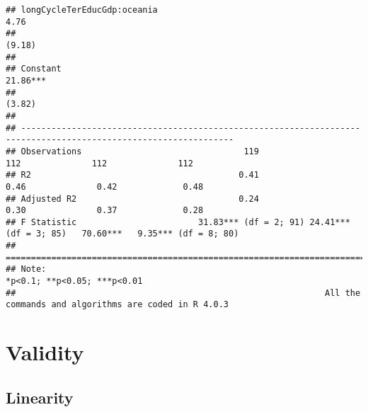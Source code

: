 \documentclass[
]{article}
\newenvironment{Shaded}{\begin{snugshade}}{\end{snugshade}}
\newcommand{\AttributeTok}[1]{\textcolor[rgb]{0.77,0.63,0.00}{#1}}
\newcommand{\FunctionTok}[1]{\textcolor[rgb]{0.00,0.00,0.00}{#1}}
\newcommand{\NormalTok}[1]{#1}
\newcommand{\SpecialCharTok}[1]{\textcolor[rgb]{0.00,0.00,0.00}{#1}}
\begin{document}
\begin{verbatim}
## longCycleTerEducGdp:oceania                                                                         4.76        
##                                                                                                    (9.18)       
##                                                                                                                 
## Constant                                                                         21.86***                       
##                                                                                   (3.82)                        
##                                                                                                                 
## ----------------------------------------------------------------------------------------------------------------
## Observations                                119                   112              112              112         
## R2                                         0.41                  0.46              0.42             0.48        
## Adjusted R2                                0.24                  0.30              0.37             0.28        
## F Statistic                        31.83*** (df = 2; 91) 24.41*** (df = 3; 85)   70.60***   9.35*** (df = 8; 80)
## ================================================================================================================
## Note:                                                                                *p<0.1; **p<0.05; ***p<0.01
##                                                             All the commands and algorithms are coded in R 4.0.3
\end{verbatim}

\hypertarget{validity}{%
\section{Validity}\label{validity}}

\hypertarget{linearity}{%
\subsection{Linearity}\label{linearity}}

\begin{Shaded}
\end{Shaded}
\end{document}
